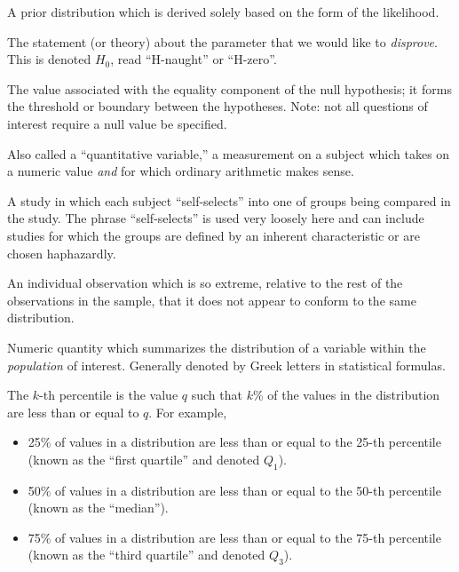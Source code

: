 \documentclass[
  letterpaper,
  DIV=11,
  numbers=noendperiod]{scrreprt}
\providecommand{\tightlist}{%
  \setlength{\itemsep}{0pt}\setlength{\parskip}{0pt}}\usepackage{longtable,booktabs,array}
\theoremstyle{definition}
\theoremstyle{definition}
\theoremstyle{plain}
\theoremstyle{remark}
\begin{document}
\begin{description}
\tightlist
\item[Noninformative Prior (Definition~\ref{def-noninformative-prior})]
A prior distribution which is derived solely based on the form of the
likelihood.
\item[Null Hypothesis (Definition~\ref{def-null-hypothesis})]
The statement (or theory) about the parameter that we would like to
\emph{disprove}. This is denoted \(H_0\), read ``H-naught'' or
``H-zero''.
\item[Null Value (Definition~\ref{def-null-value})]
The value associated with the equality component of the null hypothesis;
it forms the threshold or boundary between the hypotheses. Note: not all
questions of interest require a null value be specified.
\item[Numeric Variable (Definition~\ref{def-numeric})]
Also called a ``quantitative variable,'' a measurement on a subject
which takes on a numeric value \emph{and} for which ordinary arithmetic
makes sense.
\item[Observational Study (Definition~\ref{def-observational-study})]
A study in which each subject ``self-selects'' into one of groups being
compared in the study. The phrase ``self-selects'' is used very loosely
here and can include studies for which the groups are defined by an
inherent characteristic or are chosen haphazardly.
\item[Outlier (Definition~\ref{def-outlier})]
An individual observation which is so extreme, relative to the rest of
the observations in the sample, that it does not appear to conform to
the same distribution.
\item[Parameter (Definition~\ref{def-parameter})]
Numeric quantity which summarizes the distribution of a variable within
the \emph{population} of interest. Generally denoted by Greek letters in
statistical formulas.
\item[Percentile (Definition~\ref{def-percentile})]
The \(k\)-th percentile is the value \(q\) such that \(k\)\% of the
values in the distribution are less than or equal to \(q\). For example,
\end{description}

\begin{itemize}
\tightlist
\item
  25\% of values in a distribution are less than or equal to the 25-th
  percentile (known as the ``first quartile'' and denoted \(Q_1\)).
\item
  50\% of values in a distribution are less than or equal to the 50-th
  percentile (known as the ``median'').
\item
  75\% of values in a distribution are less than or equal to the 75-th
  percentile (known as the ``third quartile'' and denoted \(Q_3\)).
\end{itemize}
\end{document}

